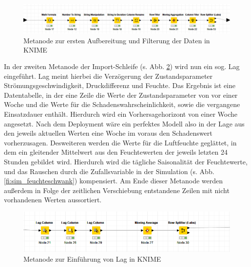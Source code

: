     \begin{figure}[H]
        \begin{center}
            \includegraphics[width=\linewidth]{images/knime_filter.png}
            \caption[KNIME Filter Metanode]{Metanode zur ersten Aufbereitung und Filterung der Daten in KNIME}
            \label{fi:knime_filter}
        \end{center}
    \end{figure}
    In der zweiten Metanode der Import-Schleife (s. Abb. \ref{fi:knime_lag}) wird nun ein sog. Lag eingeführt. Lag meint hierbei die Verzögerung der Zustandsparameter  Strömungsgeschwindigkeit, Druckdifferenz und Feuchte. Das Ergebnis ist eine Datentabelle, in der eine Zeile die Werte der Zustandsparameter von vor einer Woche und die Werte für die Schadenswahrscheinlichkeit, sowie die vergangene Einsatzdauer enthält. Hierdurch wird ein Vorhersagehorizont von einer Woche angesetzt. Nach dem Deployment wäre ein perfektes Modell also in der Lage aus den jeweils aktuellen Werten eine Woche im voraus den Schadenswert vorherzusagen. Desweiteren werden die Werte für die Luftfeuchte geglättet, in dem ein gleitender Mittelwert aus den Feuchtewerten der jeweils letzten 24 Stunden gebildet wird. Hierdurch wird die tägliche Saisonalität der Feuchtewerte, und das Rauschen durch die Zufallsvariable in der Simulation (s. Abb. \ref{fi:sim_feuchteschwank}) kompensiert. Am Ende dieser Metanode werden außerdem in Folge der zeitlichen Verschiebung entstandene Zeilen mit nicht vorhandenen Werten aussortiert.
    \begin{figure}[H]
        \begin{center}
            \includegraphics[width=\linewidth]{images/knime_lag.png}
            \caption[KNIME Lag Metanode]{Metanode zur Einführung von Lag in KNIME}
            \label{fi:knime_lag}
        \end{center}
    \end{figure}
